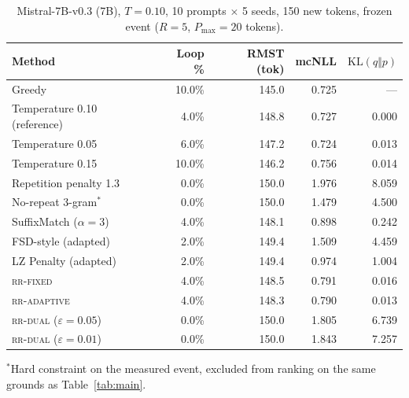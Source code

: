 \documentclass[11pt]{article}
\newcommand{\KL}{\mathrm{KL}}
\begin{document}
\begin{table}[ht]
\centering
\caption{Mistral-7B-v0.3 (7B), $T{=}0.10$, 10 prompts $\times$ 5 seeds, 150 new tokens, frozen event ($R{=}5$, $P_{\max}{=}20$ tokens).}
\label{tab:mistralfull}
\begin{tabular}{@{}lrrrr@{}}
\toprule
Method & Loop \% & RMST (tok) & mcNLL & $\KL(q\Vert p)$ \\
\midrule
Greedy                      & 10.0\% & 145.0 & 0.725 & --- \\
Temperature 0.10 (reference) & 4.0\%  & 148.8 & 0.727 & 0.000 \\
Temperature 0.05             & 6.0\%  & 147.2 & 0.724 & 0.013 \\
Temperature 0.15             & 10.0\% & 146.2 & 0.756 & 0.014 \\
Repetition penalty 1.3        & 0.0\%  & 150.0 & 1.976 & 8.059 \\
No-repeat 3-gram$^{*}$       & 0.0\%  & 150.0 & 1.479 & 4.500 \\
SuffixMatch ($\alpha{=}3$)    & 4.0\%  & 148.1 & 0.898 & 0.242 \\
FSD-style (adapted)          & 2.0\%  & 149.4 & 1.509 & 4.459 \\
LZ Penalty (adapted)        & 2.0\%  & 149.4 & 0.974 & 1.004 \\
\textsc{rr-fixed}             & 4.0\%  & 148.5 & 0.791 & 0.016 \\
\textsc{rr-adaptive}          & 4.0\%  & 148.3 & 0.790 & 0.013 \\
\textsc{rr-dual} ($\varepsilon{=}0.05$) & 0.0\% & 150.0 & 1.805 & 6.739 \\
\textsc{rr-dual} ($\varepsilon{=}0.01$) & 0.0\% & 150.0 & 1.843 & 7.257 \\
\bottomrule
\end{tabular}

\vspace{4pt}
{\footnotesize $^{*}$Hard constraint on the measured event, excluded from ranking on the same grounds as Table~\ref{tab:main}.}
\end{table}
\end{document}

